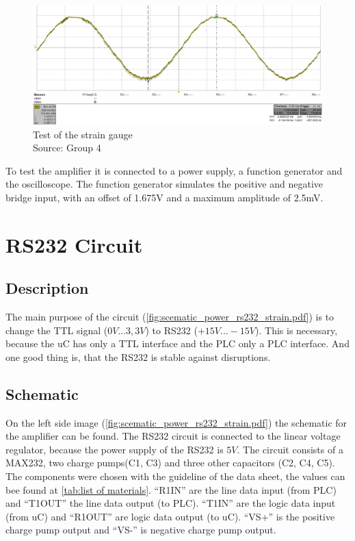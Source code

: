 \documentclass[a4paper,12pt]{scrreprt}
\begin{document}
\begin{figure}[H]
  \centering
   \includegraphics[width=1\textwidth]{pictures/Strain_gauge_test}
   \caption[Test of the strain gauge]{Test of the strain gauge\\
	Source: Group 4  
  }
   \label{fig:Strain_gauge_test}
\end{figure} 

To test the amplifier it is connected to a power supply, a function generator and the oscilloscope. The function generator simulates the positive and negative bridge input, with an offset of 1.675V and a maximum amplitude of 2.5mV.

\section{\acs{RS232} Circuit}
\subsection{Description}
The main purpose of the circuit (\autoref{fig:scematic_power_rs232_strain.pdf}) is to change the \acs{TTL} signal ($0V...3,3V$) to \acs{RS232} ($+15V...-15V$). This is necessary, because the \acs{uC} has only a \acs{TTL} interface  and the \acs{PLC} only a \acs{PLC} interface. And one good thing is, that the \acs{RS232} is stable against disruptions.

\subsection{Schematic}
On the left side image (\autoref{fig:scematic_power_rs232_strain.pdf}) the schematic for the amplifier can be found. The \acs{RS232} circuit is connected to the linear voltage regulator, because the power supply of the  \acs{RS232} is $5V$. The circuit consists of a MAX232, two charge pumps(C1, C3) and three other capacitors (C2, C4, C5). The components were chosen with the guideline of the data sheet, the values can bee found at \autoref{tab:list of materials}. \enquote{R1IN} are the line data input (from \acs{PLC}) and \enquote{T1OUT} the line data output (to \acs{PLC}). \enquote{T1IN} are the logic data input (from \acs{uC}) and \enquote{R1OUT} are logic data output (to \acs{uC}). \enquote{VS+} is the positive charge pump output and \enquote{VS-}  is negative charge pump output.
\end{document}
